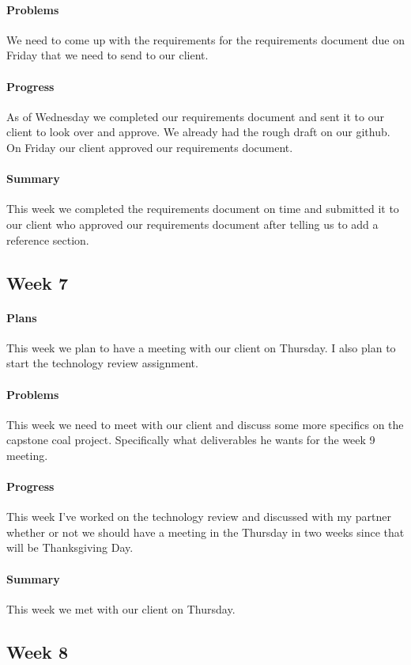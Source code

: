 \documentclass{article}
\begin{document}
\paragraph{Problems}
We need to come up with the requirements for the requirements document due on Friday that we need to send to our client. 
\paragraph{Progress}
As of Wednesday we completed our requirements document and sent it to our client to look over and approve. We already had the rough draft on our github. On Friday our client approved our requirements document. 
\paragraph{Summary}
This week we completed the requirements document on time and submitted it to our client who approved our requirements document after telling us to add a reference section. 
\subsection{Week 7}
\paragraph{Plans}
This week we plan to have a meeting with our client on Thursday.  I also plan to start the technology review assignment.
\paragraph{Problems}
This week we need to meet with our client and discuss some more specifics on the capstone coal project. Specifically what deliverables he wants for the week 9 meeting. 
\paragraph{Progress}
This week I've worked on the technology review and discussed with my partner whether or not we should have a meeting in the Thursday in two weeks since that will be Thanksgiving Day.
\paragraph{Summary}
 This week we met with our client on Thursday. 
\subsection{Week 8}
\end{document}
